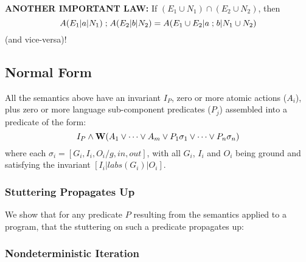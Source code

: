 \textbf{ANOTHER IMPORTANT LAW:}
If $(E_1 \cup N_1) \cap (E_2 \cup N_2)$, then
\[
  A(E_1|a|N_1) \mathrel{;} A(E_2|b|N_2)
  =
  A(E_1\cup E_2|a\mathrel{;} b|N_1\cup N_2)
\]
(and vice-versa)!

\subsection{Normal Form}\label{sec:normal-form}

All the semantics above have an invariant $I_P$,
zero or more atomic actions ($A_i$),
plus zero or more language sub-component predicates ($P_j$)
assembled into a predicate of the form:
\[
  I_P
  \land
  \mathbf{W}( A_1 \lor \dots \lor A_m
     \lor
     P_1\sigma_1 \lor \dots \lor P_n\sigma_n )
\]
where each $\sigma_i = [G_i,I_i,O_i/g,in,out]$,
with all $G_i$, $I_i$ and $O_i$ being ground
and satisfying the invariant $[I_i|labs(G_i)|O_i]$.

\subsubsection{Stuttering Propagates Up}

We show that for any predicate $P$ resulting from the
semantics applied to a program,
that the stuttering on such a predicate propagates up:



\subsubsection{Nondeterministic Iteration}

